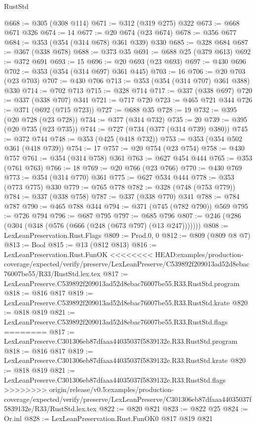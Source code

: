 \begin{lexlean}{RustStd}
\begin{coremodule}
{\begin{coremodule}
{{{{{{{{@668 := @305 (@308 @114)
@671 := @312 (@319 @275) @322
@673 := @668 @671 @326
@674 := 14
@677 := @20 @674 (@23 @674)
@678 := @356 @677
@684 := @353 (@354 (@314 @678) @361 @339) @330
@685 := @328 @684
@687 := @367 (@338 @678)
@688 := @373 @35
@691 := @688 @25 (@379 @613)
@692 := @372 @691
@693 := 15
@696 := @20 @693 (@23 @693)
@697 := @430 @696
@702 := @353 (@354 (@314 @697) @361 @445)
@703 := 16
@706 := @20 @703 (@23 @703)
@707 := @430 @706
@713 := @353 (@354 (@314 @707) @361 @388) @330
@714 := @702 @713
@715 := @328 @714
@717 := @337 (@338 @697)
@720 := @337 (@338 @707) @341
@721 := @717 @720
@723 := @465 @721 @344
@726 := @371 (@692 (@715 @723))
@727 := @688 @35
@728 := 19
@732 := @395 (@20 @728 (@23 @728))
@734 := @377 (@314 @732)
@735 := 20
@739 := @395 (@20 @735 (@23 @735))
@744 := @727 (@734 (@377 (@314 @739) @380))
@745 := @372 @744
@748 := @353 (@425 (@418 @732))
@753 := @353 (@354 @502 @361 (@418 @739))
@754 := 17
@757 := @20 @754 (@23 @754)
@758 := @430 @757
@761 := @354 (@314 @758) @361
@763 := @627 @454 @444
@765 := @353 (@761 @763)
@766 := 18
@769 := @20 @766 (@23 @766)
@770 := @430 @769
@773 := @354 (@314 @770) @361
@775 := @627 @534 @444
@778 := @353 (@773 @775) @330
@779 := @765 @778
@782 := @328 (@748 (@753 @779))
@784 := @337 (@338 @758)
@787 := @337 (@338 @770) @341
@788 := @784 @787
@790 := @465 @788 @344
@794 := @371 (@745 (@782 @790)) @569
@795 := @726 @794
@796 := @687 @795
@797 := @685 @796
@807 := @246 (@286 (@304 (@348 (@576 (@666 (@248 (@673 @797) (@13 @247)))))))
@808 := LexLeanPreservation.Rust.Flags
@809 := Prod.{0, 0}
@812 := @809 (@809 @8 @7)
@813 := Bool
@815 := @13 (@812 @813)
@816 := LexLeanPreservation.Rust.FunOK
<<<<<<<< HEAD:examples/production-coverage/expected/verify/preserve/LexLeanPreserve/C539892f209013ad52d8ebac76007be55/R33/RustStd.lex.tex
@817 := LexLeanPreserve.C539892f209013ad52d8ebac76007be55.R33.RustStd.program
@818 := @816 @817
@819 := LexLeanPreserve.C539892f209013ad52d8ebac76007be55.R33.RustStd.krate
@820 := @818 @819
@821 := LexLeanPreserve.C539892f209013ad52d8ebac76007be55.R33.RustStd.flags
========
@817 := LexLeanPreserve.C301306eb87dfaaa44035037f5839132e.R33.RustStd.program
@818 := @816 @817
@819 := LexLeanPreserve.C301306eb87dfaaa44035037f5839132e.R33.RustStd.krate
@820 := @818 @819
@821 := LexLeanPreserve.C301306eb87dfaaa44035037f5839132e.R33.RustStd.flags
>>>>>>>> origin/release/v0.5:examples/production-coverage/expected/verify/preserve/LexLeanPreserve/C301306eb87dfaaa44035037f5839132e/R33/RustStd.lex.tex
@822 := @820 @821
@823 := @822 @25
@824 := Or.inl
@828 := LexLeanPreservation.Rust.FunOK0 @817 @819 @821
}}}}}}}}
\end{coremodule}}
\end{coremodule}
\end{lexlean}
